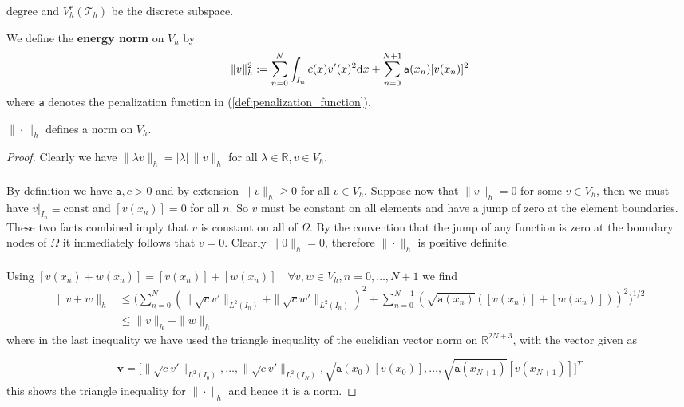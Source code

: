 degree and $V_h^r(\mathcal{T}_h)$ be the discrete subspace.
\begin{definition}
    We define the \textbf{energy norm} on $V_h$ by 
    \begin{equation}
        \label{def:energy_norm}
        \|v\|_h^2 := \sum_{n=0}^{N} \int_{I_n} c(x)v'(x)^2\text{d}x + \sum_{n=0}^{N+1}{\normalfont\texttt{a}}(x_n)[v(x_n)]^2 
    \end{equation}
    where {\normalfont\texttt{a}} denotes the penalization function in (\ref{def:penalization_function}).
\end{definition}
\begin{lemma}
    $\|\cdot\|_h$ defines a norm on $V_h$.
\end{lemma}
\begin{proof}
    Clearly we have $\|\lambda v\|_h =|\lambda|\, \|v\|_h$ for all $\lambda \in \mathbb{R}, v\in V_h$. \\ \\
    By definition we have $\texttt{a}, c>0$ and by extension $\|v\|_h \geq 0$ for all
    $v\in V_h$. Suppose now that $\|v\|_h = 0$ for some $v\in V_h$, then we must have $v|_{I_n} \equiv \text{const}$ 
    and $[v(x_n)] = 0$ for all $n$. So $v$ must be constant on all elements and have a jump of zero at the element boundaries.
    These two facts combined imply that $v$ is constant on all of $\Omega$. By the convention that the jump 
    of any function is zero at the boundary nodes of $\Omega$ it immediately follows that $v=0$. Clearly
    $\|0\|_h=0$, therefore $\|\cdot\|_h$ is positive definite. \\ \\
    Using $[v(x_n) + w(x_n)] = [v(x_n)] + [w(x_n)] \quad \forall v,w \in V_h, n = 0,\ldots,N+1$ we find
    \begin{align*}
        \|v+w\|_h &\leq \Big(\sum_{n=0}^{N} (\|\sqrt{c}v'\|_{L^2(I_n)}+\|\sqrt{c}w'\|_{L^2(I_n)})^2 + 
        \sum_{n=0}^{N+1} (\sqrt{\texttt{a}(x_n)}([v(x_n)] + [w(x_n)]))^2\Big)^{1/2} \\
        &\leq \|v\|_h + \|w\|_h
    \end{align*}
    where in the last inequality we have used the triangle inequality of the euclidian vector norm on $\mathbb{R}^{2N+3}$, with the vector given
    as 
    
    \[
    \textbf{v} = \big[\|\sqrt{c}v'\|_{L^2(I_0)},\ldots,\|\sqrt{c}v'\|_{L^2(I_N)}, \sqrt{\texttt{a}(x_0)}[v(x_0)],\ldots,\sqrt{\texttt{a}(x_{N+1})}[v(x_{N+1})]\big]^T
    \]
    this shows the triangle inequality for $\|\cdot\|_h$ and hence it is a norm.
\end{proof}


